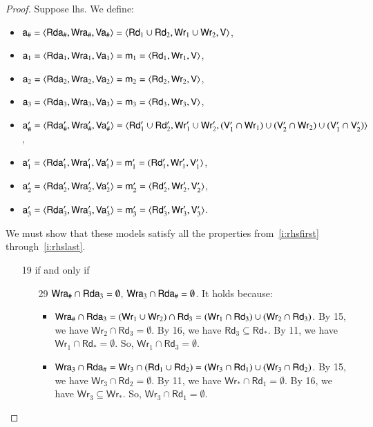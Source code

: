 \documentclass{llncs}
\newcommand{\modl}{\mathsf m}
\newcommand{\readset}{\mathsf{Rd}}
\newcommand{\valuset}{\mathsf{V}}
\newcommand{\writeset}{\mathsf{Wr}}
\newcommand{\tuple}[1]{ \langle #1 \rangle}
\begin{document}
\begin{proof}
Suppose lhs. We define:
\begin{itemize} 
\item $\modla_\# = \tuple{\readseta_\#, \writeseta_\#, \valuseta_\#} = \tuple{\readset_1 \cup \readset_2, \writeset_1 \cup \writeset_2, \valuset}$,
\item $\modla_1 = \tuple{\readseta_1, \writeseta_1, \valuseta_1} = \modl_1 = \tuple{\readset_1, \writeset_1, \valuset}$,
\item $\modla_2 = \tuple{\readseta_2, \writeseta_2, \valuseta_2} = \modl_2 = \tuple{\readset_2, \writeset_2, \valuset}$,
\item $\modla_3 = \tuple{\readseta_3, \writeseta_3, \valuseta_3} = \modl_3 = \tuple{\readset_3, \writeset_3, \valuset}$,
\item $\modla'_\# = \tuple{\readseta'_\#, \writeseta'_\#, \valuseta'_\#} = \tuple{\readset'_1 \cup \readset'_2, \writeset'_1 \cup \writeset'_2, (\valuset'_1 \cap \writeset_1) \cup (\valuset'_2 \cap \writeset_2) \cup (\valuset'_1 \cap \valuset'_2)}$,
\item $\modla'_1 = \tuple{\readseta'_1, \writeseta'_1, \valuseta'_1) = \modl'_1 = (\readset'_1, \writeset'_1, \valuset'_1}$,
\item $\modla'_2 = \tuple{\readseta'_2, \writeseta'_2, \valuseta'_2} = \modl'_2 = \tuple{\readset'_2, \writeset'_2, \valuset'_2}$,
\item $\modla'_3 = \tuple{\readseta'_3, \writeseta'_3, \valuseta'_3} = \modl'_3 = \tuple{\readset'_3, \writeset'_3, \valuset'_3}$. 
\end{itemize}

We must show that these models satisfy all the properties from~\ref{i:rhsfirst} through~\ref{i:rhslast}.
\begin{itemize}
\item[19] if and only if
  \begin{itemize}
  \item[29]  $\mathsf {Wra}_\# \cap \mathsf {Rda}_3 = \emptyset$,
    $\mathsf {Wra}_3 \cap \mathsf {Rda}_\# = \emptyset$. It holds because:
    \begin{itemize}
    \item $\writeseta_\# \cap \readseta_3 = (\writeset_1 \cup \writeset_2) \cap \readset_3 = (\writeset_1 \cap \readset_3) \cup (\writeset_2 \cap \readset_3)$.
      By 15, we have $\writeset_2 \cap \readset_3 = \emptyset$.
      By 16, we have $\readset_3 \subseteq \readset_*$.
      By 11, we have $\writeset_1 \cap \readset_* = \emptyset$. So, $\writeset_1 \cap \readset_3 = \emptyset$.
    \item $\writeseta_3 \cap \readseta_\# = \writeset_3 \cap (\readset_1 \cup \readset_2) = (\writeset_3 \cap \readset_1) \cup (\writeset_3 \cap \readset_2)$.
      By 15, we have $\writeset_3 \cap \readset_2 = \emptyset$.
      By 11, we have $\writeset_* \cap \readset_1 = \emptyset$.
      By 16, we have $\writeset_3 \subseteq \writeset_*$.
      So, $\writeset_3 \cap \readset_1 = \emptyset$.
    \end{itemize}
  

\end{itemize}
\end{itemize}
\end{proof}
\end{document}
